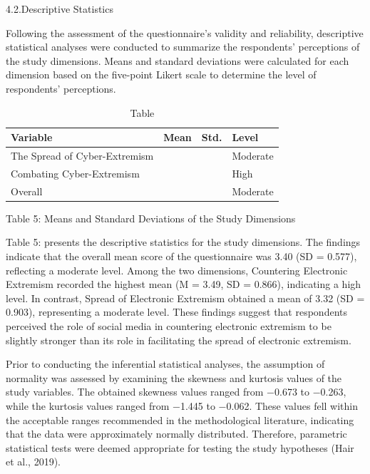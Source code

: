 \documentclass[10pt]{NSP1}
\begin{document}
4.2.Descriptive Statistics

Following the assessment of the questionnaire's validity and reliability, descriptive statistical analyses were conducted to summarize the respondents' perceptions of the study dimensions. Means and standard deviations were calculated for each dimension based on the five-point Likert scale to determine the level of respondents' perceptions.

\begin{table}[tbp]
\centering
{\small
\begin{tabular}{|p{}|>{\centering\arraybackslash}p{}|>{\centering\arraybackslash}p{}|>{\centering\arraybackslash}p{}|}
\hline
\cellcolor[HTML]{DDD9C3}\textbf{Variable} & \cellcolor[HTML]{DDD9C3}\textbf{Mean} & \cellcolor[HTML]{DDD9C3}\textbf{Std.} & \cellcolor[HTML]{DDD9C3}\textbf{Level} \\
\hline
\cellcolor[HTML]{DDD9C3}The Spread of Cyber-Extremism & 3.32 & 0.903 & Moderate \\
\hline
\cellcolor[HTML]{DDD9C3}Combating Cyber-Extremism & 3.49 & 0.866 & High \\
\hline
\cellcolor[HTML]{DDD9C3}Overall & 3.40 & 0.577 & Moderate \\
\hline
\end{tabular}}
\caption{Table}

\end{table}

Table 5: Means and Standard Deviations of the Study Dimensions

Table 5: presents the descriptive statistics for the study dimensions. The findings indicate that the overall mean score of the questionnaire was 3.40 (SD = 0.577), reflecting a moderate level. Among the two dimensions, Countering Electronic Extremism recorded the highest mean (M = 3.49, SD = 0.866), indicating a high level. In contrast, Spread of Electronic Extremism obtained a mean of 3.32 (SD = 0.903), representing a moderate level. These findings suggest that respondents perceived the role of social media in countering electronic extremism to be slightly stronger than its role in facilitating the spread of electronic extremism.

Prior to conducting the inferential statistical analyses, the assumption of normality was assessed by examining the skewness and kurtosis values of the study variables. The obtained skewness values ranged from −0.673 to −0.263, while the kurtosis values ranged from −1.445 to −0.062. These values fell within the acceptable ranges recommended in the methodological literature, indicating that the data were approximately normally distributed. Therefore, parametric statistical tests were deemed appropriate for testing the study hypotheses (Hair et al., 2019).
\end{document}
